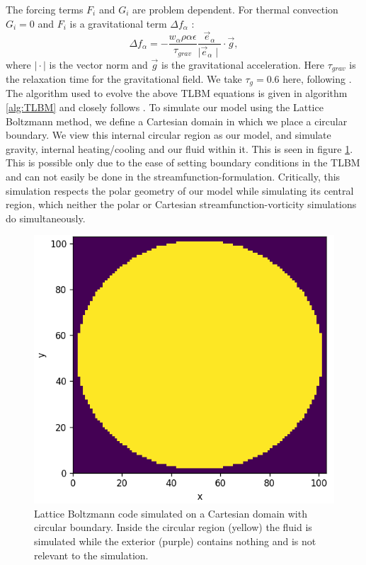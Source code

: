\documentclass{article}
\begin{document}
\noindent The forcing terms $F_i$ and $G_i$ are problem dependent. For thermal convection 
$G_i=0$ and $F_i$ is a gravitational term ${\Delta f}_{\alpha}$ \cite{mora2017simulation}:
\begin{equation}
	{\Delta f}_{\alpha} = - 
	\frac{w_{\alpha} \rho \alpha \epsilon}{\tau_{grav}}
	 \frac{\vec{e}_{\alpha}}{\mid \vec{e}_{\alpha} \mid} \cdot \vec{g} ,
\end{equation}
\noindent where $\mid \cdot \mid$ is the vector norm and $\vec{g}$ is the gravitational 
acceleration. Here $\tau_{grav}$ is the relaxation time for the gravitational field. We 
take $\tau_g=0.6$ here, following \cite{mora2017simulation}. The algorithm used to evolve 
the above TLBM equations is given in algorithm \ref{alg:TLBM} and closely follows 
\cite{mora2017simulation}.
\newline
\noindent To simulate our model using the Lattice Boltzmann method, we define a Cartesian domain in which we place a circular boundary. We view this internal circular region as our model, and simulate gravity, internal heating/cooling and our fluid within it. This is seen in figure \ref{TLBM model}. This is possible only due to the ease of setting boundary conditions in the TLBM and can not easily be done in the streamfunction-formulation.
Critically, this simulation respects the polar geometry of our model while simulating its central region, which neither the polar or Cartesian streamfunction-vorticity simulations do simultaneously.

\begin{figure}[H]
	\centering
	\includegraphics{latticeBoltzmanModel.png}
	\caption{Lattice Boltzmann code simulated on a Cartesian domain with circular boundary. Inside the circular region (yellow) the fluid is simulated while the exterior (purple) contains nothing and is not relevant to the simulation.}
	\label{TLBM model}
\end{figure}
\end{document}
